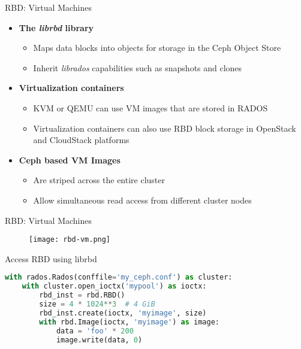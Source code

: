 \begin{frame}{RBD: Virtual Machines}
    \begin{itemize}
        \item \textbf{The \textit{librbd} library}
            \begin{itemize}
                \item Maps data blocks into objects for storage in the Ceph Object Store
                \item Inherit \textit{librados} capabilities such as snapshots and clones
            \end{itemize}
        \item \textbf{Virtualization containers}
            \begin{itemize}
                \item KVM or QEMU can use VM images that are stored in RADOS
                \item Virtualization containers can also use RBD block storage in OpenStack and CloudStack platforms
            \end{itemize}
        \item \textbf{Ceph based VM Images}
            \begin{itemize}
                \item Are striped across the entire cluster
                \item Allow simultaneous read access from different cluster nodes
            \end{itemize}
    \end{itemize}
\end{frame}

\begin{frame}{RBD: Virtual Machines}
    \begin{figure}[htpb]
        \centering
        \texttt{[image: rbd-vm.png]}
    \end{figure}
\end{frame}

\begin{frame}[fragile]{Access RBD using librbd}
\begin{lstlisting}[language=python]
with rados.Rados(conffile='my_ceph.conf') as cluster:
    with cluster.open_ioctx('mypool') as ioctx:
        rbd_inst = rbd.RBD()
        size = 4 * 1024**3  # 4 GiB
        rbd_inst.create(ioctx, 'myimage', size)
        with rbd.Image(ioctx, 'myimage') as image:
            data = 'foo' * 200
            image.write(data, 0)
\end{lstlisting}
\end{frame}

